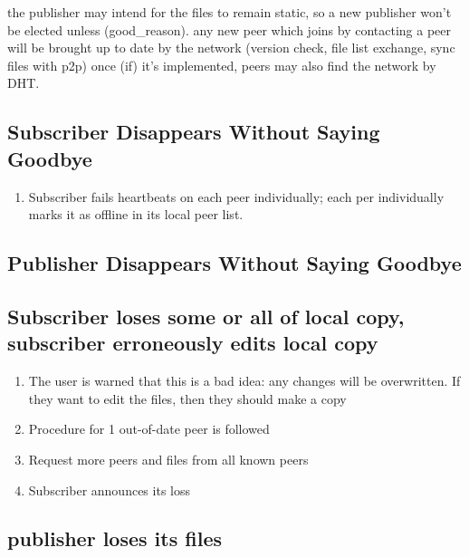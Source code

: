 \documentclass[12pt,a4paper,]{adreport}
\begin{document}
the publisher may intend for the files to remain static, so a new
publisher won't be elected unless (good\_reason). any new peer which
joins by contacting a peer will be brought up to date by the network
(version check, file list exchange, sync files with p2p) once (if) it's
implemented, peers may also find the network by DHT.

\subsection{Subscriber Disappears Without Saying
Goodbye}\label{subscriber-disappears-without-saying-goodbye}

\begin{enumerate}
\def\labelenumi{\arabic{enumi}.}
\itemsep1pt\parskip0pt
\item
  Subscriber fails heartbeats on each peer individually; each per
  individually marks it as offline in its local peer list.
\end{enumerate}

\subsection{Publisher Disappears Without Saying
Goodbye}\label{publisher-disappears-without-saying-goodbye}

\subsection{Subscriber loses some or all of local copy, subscriber
erroneously edits local
copy}\label{subscriber-loses-some-or-all-of-local-copy-subscriber-erroneously-edits-local-copy}

\begin{enumerate}
\def\labelenumi{\arabic{enumi}.}
\itemsep1pt\parskip0pt
\item
  The user is warned that this is a bad idea: any changes will be
  overwritten. If they want to edit the files, then they should make a
  copy
\item
  Procedure for 1 out-of-date peer is followed
\item
  Request more peers and files from all known peers
\item
  Subscriber announces its loss
\end{enumerate}

\subsection{publisher loses its files}\label{publisher-loses-its-files}
\end{document}
